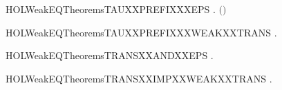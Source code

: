\newcommand{\HOLWeakEQTheoremsSTRONGXXIMPXXWEAKXXEQUIV}{\UseVerbatim{HOLWeakEQTheoremsSTRONGXXIMPXXWEAKXXEQUIV}}
\begin{SaveVerbatim}{HOLWeakEQTheoremsTAUXXPREFIXXXEPS}
\HOLTokenTurnstile{} \HOLSymConst{\HOLTokenForall{}} .    \HOLSymConst{\HOLTokenImp{}}  \ensuremath{(}\HOLConst{\ensuremath{\tau}}\HOLSymConst{\ensuremath{\ldotp}}\ensuremath{)} 
\end{SaveVerbatim}
\newcommand{\HOLWeakEQTheoremsTAUXXPREFIXXXEPS}{\UseVerbatim{HOLWeakEQTheoremsTAUXXPREFIXXXEPS}}
\begin{SaveVerbatim}{HOLWeakEQTheoremsTAUXXPREFIXXXWEAKXXTRANS}
\HOLTokenTurnstile{} \HOLSymConst{\HOLTokenForall{}}  .  \HOLTokenWeakTransBegin{}\HOLTokenWeakTransEnd {} \HOLSymConst{\HOLTokenImp{}} \HOLConst{\ensuremath{\tau}}\HOLSymConst{\ensuremath{\ldotp}} \HOLTokenWeakTransBegin{}\HOLTokenWeakTransEnd {}
\end{SaveVerbatim}
\newcommand{\HOLWeakEQTheoremsTAUXXPREFIXXXWEAKXXTRANS}{\UseVerbatim{HOLWeakEQTheoremsTAUXXPREFIXXXWEAKXXTRANS}}
\begin{SaveVerbatim}{HOLWeakEQTheoremsTRANSXXANDXXEPS}
\HOLTokenTurnstile{} \HOLSymConst{\HOLTokenForall{}}   .  \HOLTokenTransBegin{}\HOLTokenTransEnd {} \HOLSymConst{\HOLTokenConj{}}    \HOLSymConst{\HOLTokenImp{}}  \HOLTokenWeakTransBegin{}\HOLTokenWeakTransEnd {}
\end{SaveVerbatim}
\newcommand{\HOLWeakEQTheoremsTRANSXXANDXXEPS}{\UseVerbatim{HOLWeakEQTheoremsTRANSXXANDXXEPS}}
\begin{SaveVerbatim}{HOLWeakEQTheoremsTRANSXXIMPXXWEAKXXTRANS}
\HOLTokenTurnstile{} \HOLSymConst{\HOLTokenForall{}}  .  \HOLTokenTransBegin{}\HOLTokenTransEnd {} \HOLSymConst{\HOLTokenImp{}}  \HOLTokenWeakTransBegin{}\HOLTokenWeakTransEnd {}
\end{SaveVerbatim}
